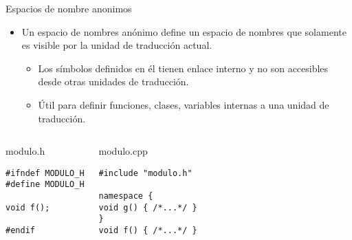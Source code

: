 \begin{frame}[t,fragile]{Espacios de nombre anonimos}
\begin{itemize}
  \item Un espacio de nombres anónimo define un espacio de nombres que solamente es visible
        por la unidad de traducción actual.
    \begin{itemize}
      \item Los símbolos definidos en él tienen enlace interno y no son accesibles desde otras
            unidades de traducción.
      \item Útil para definir funciones, clases, variables internas a una unidad de traducción.
    \end{itemize}
\end{itemize}
\begin{columns}


\begin{block}{modulo.h}
\begin{lstlisting}
#ifndef MODULO_H
#define MODULO_H

void f();

#endif
\end{lstlisting}
\end{block}


\begin{block}{modulo.cpp}
\begin{lstlisting}
#include "modulo.h"

namespace {
void g() { /*...*/ }
}
void f() { /*...*/ }
\end{lstlisting}
\end{block}

\end{columns}
\end{frame}
